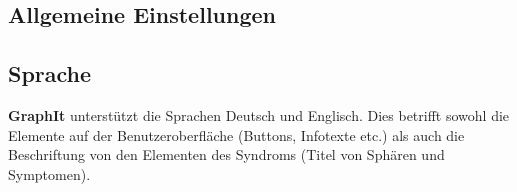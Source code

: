 \documentclass[enabledeprecatedfontcommands,fontsize=11pt,paper=a4,twoside]{scrartcl}
\begin{document}
 		\begin{figure}[ht!]
 			\centering
 			
 		\end{figure}
		
\subsection{Allgemeine Einstellungen} \label{settings}
	
\subsection{Sprache}
\textbf{GraphIt} unterstützt die Sprachen Deutsch und Englisch. Dies betrifft sowohl die Elemente auf der Benutzeroberfläche (Buttons, Infotexte etc.) als auch die Beschriftung von den Elementen des Syndroms (Titel von Sphären und Symptomen).\\
	
\newpage
\end{document}
